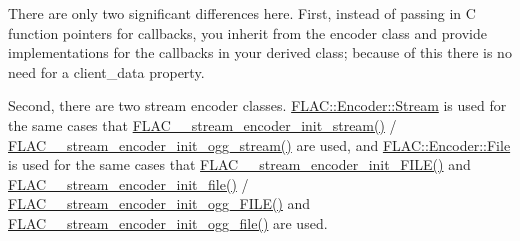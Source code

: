 There are only two significant differences here. First, instead of passing in C function pointers for callbacks, you inherit from the encoder class and provide implementations for the callbacks in your derived class; because of this there is no need for a \textquotesingle{}client\+\_\+data\textquotesingle{} property.

Second, there are two stream encoder classes. \hyperlink{class_f_l_a_c_1_1_encoder_1_1_stream}{F\+L\+A\+C\+::\+Encoder\+::\+Stream} is used for the same cases that \hyperlink{group__flac__stream__encoder_ga85221c4ceb9f22dfd4983d8f07a9a35b}{F\+L\+A\+C\+\_\+\+\_\+stream\+\_\+encoder\+\_\+init\+\_\+stream()} / \hyperlink{group__flac__stream__encoder_ga87af71d74c09f7d482f9f420ef9bf826}{F\+L\+A\+C\+\_\+\+\_\+stream\+\_\+encoder\+\_\+init\+\_\+ogg\+\_\+stream()} are used, and \hyperlink{class_f_l_a_c_1_1_encoder_1_1_file}{F\+L\+A\+C\+::\+Encoder\+::\+File} is used for the same cases that \hyperlink{group__flac__stream__encoder_ga78653fea5d9bc490fff34e3ef86de944}{F\+L\+A\+C\+\_\+\+\_\+stream\+\_\+encoder\+\_\+init\+\_\+\+F\+I\+L\+E()} and \hyperlink{group__flac__stream__encoder_ga693bb5ed30d912822e0e6c7c0404428c}{F\+L\+A\+C\+\_\+\+\_\+stream\+\_\+encoder\+\_\+init\+\_\+file()} / \hyperlink{group__flac__stream__encoder_gab44c7f51a61826e04abd8cdf5c1ceac2}{F\+L\+A\+C\+\_\+\+\_\+stream\+\_\+encoder\+\_\+init\+\_\+ogg\+\_\+\+F\+I\+L\+E()} and \hyperlink{group__flac__stream__encoder_ga51eb79f04e9a676cd1ce0c94729252e4}{F\+L\+A\+C\+\_\+\+\_\+stream\+\_\+encoder\+\_\+init\+\_\+ogg\+\_\+file()} are used. 